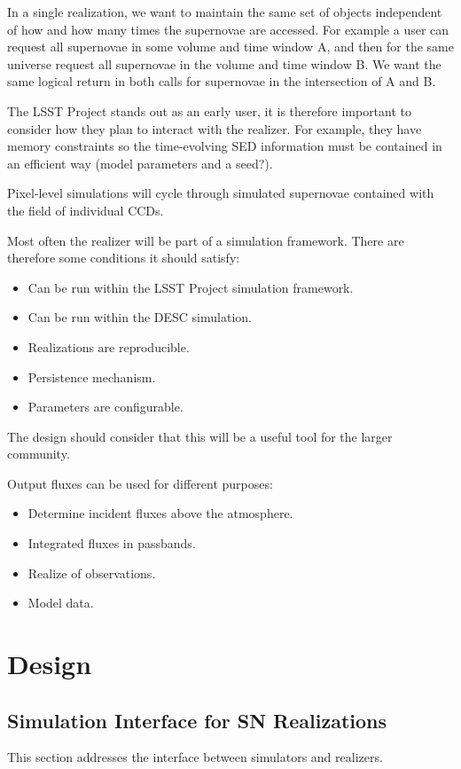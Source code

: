 \documentclass[preprint]{aastex}
\begin{document}
In a single realization, we want to maintain the same set of objects independent of how and how
many times the supernovae are accessed.  For example a user can request all supernovae in some volume and time window A, and then for the same universe request  all supernovae in
the volume and time window B.  We want the same logical return in both calls for supernovae in the intersection of A and B.

The LSST Project stands out as an early user, it is therefore important
to consider how they plan to interact with the realizer.
For example,
they have memory constraints so the time-evolving SED information must be contained in an efficient way (model parameters and a seed?).

Pixel-level simulations will cycle through simulated supernovae contained with
the field of individual CCDs.

Most often the realizer will be part of a simulation framework.  There are therefore
some conditions it should satisfy:
\begin{itemize}
\item Can be run within the LSST Project simulation framework.
\item Can be run within the DESC simulation.
\item Realizations are reproducible.
\item Persistence mechanism.
\item Parameters are configurable.
\end{itemize}
The design should consider that this will be a useful tool for the larger community.


Output fluxes can be used for different purposes:
\begin{itemize}
\item Determine incident fluxes above the atmosphere.
\item Integrated fluxes in passbands.
\item Realize of observations.
\item Model data.
\end{itemize}


\section{Design}
\subsection{Simulation Interface for SN Realizations}
This section addresses the interface between simulators and realizers.
\end{document}
